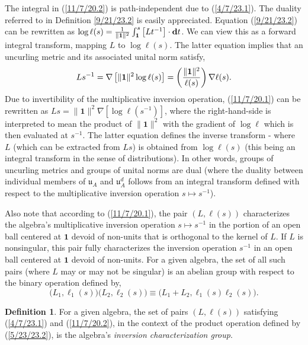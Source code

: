 \documentclass{amsart}
\numberwithin{equation}{section}
\theoremstyle{definition}
\newtheorem{definition}[theorem]{Definition}
\numberwithin{theorem}{section}
\begin{document}
   
The integral in (\ref{11/7/20.2}) is path-independent due to (\ref{4/7/23.1}).  The duality referred to in Definition \ref{9/21/23.2} is easily appreciated.  Equation (\ref{9/21/23.2}) can be rewritten as  \mbox{$\log\ell(s) = \frac{1}{\|\mathbf{1}\|^2}\int_{{\bf 1}}^{s} \left[L t^{-1}\right]\cdot \mathbf{d}t$.}   We can view this as a forward integral transform, mapping $L$ to $\log \ell(s)$.   The latter equation implies that an uncurling metric and its associated unital norm satisfy,  \begin{equation}\label{11/7/20.1} Ls^{-1}  = \nabla\left[\|{\bf 1}\|^2\log  \ell(s)\right] =   \left(\frac{\|{\bf 1}\|^2}{ \ell(s)}\right)\nabla \ell(s).\end{equation}  Due to invertibility of the multiplicative inversion operation,  (\ref{11/7/20.1}) can be rewritten as  $Ls = \|\mathbf{1}\|^2 \nabla\left[\log \ell(s^{-1})\right]$, where the right-hand-side is interpreted to mean the product of $\|\mathbf{1}\|^2$ with the gradient of $\log \ell$ which is then evaluated at $s^{-1}$.  The latter equation defines the inverse transform - where $L$ (which can be extracted from $Ls$) is obtained from $\log\ell(s)$ (this being an integral transform in the sense of distributions).  
In other words, groups of uncurling metrics and groups of unital norms are dual (where the duality between individual members of  $\mathfrak{u}_A$ and $\mathfrak{u}_A^d$ follows from an integral transform defined with respect to the multiplicative inversion operation $s\mapsto s^{-1}$).
   
    
Also note that according to (\ref{11/7/20.1}), the pair $(L, \ell(s))$ characterizes the algebra's multiplicative inversion operation $s\mapsto s^{-1}$ in the portion of an open ball centered at $\mathbf{1}$ devoid of non-units that is orthogonal to the kernel of $L$.  If $L$ is nonsingular, this pair fully characterizes the inversion operation $s^{-1}$ in an open ball centered at $\mathbf{1}$ devoid of non-units.  For a given algebra, the set of all such pairs (where $L$ may or may not be singular) is an abelian group with respect to the binary operation defined by,
\begin{equation}\label{5/23/23.2} \big(L_1, \ell_1(s)\big)\big(L_2, \ell_2(s)\big) \equiv 
\big(L_1+L_2, \ell_1(s)  \ell_2(s)\big).\end{equation} 
\begin{definition} For a given algebra, the set of pairs $(L, \ell(s))$ satisfying (\ref{4/7/23.1}) and (\ref{11/7/20.2}), in the context of the product operation defined by (\ref{5/23/23.2}), is the algebra's {\it inversion characterization group}. \end{definition}
\end{document}
